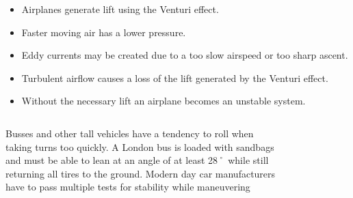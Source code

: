 \begin{frame}
	\begin{itemize}
		\item Airplanes generate lift using the Venturi effect.
		\item Faster moving air has a lower pressure.
		\item Eddy currents may be created due to a too slow airspeed or too sharp ascent.
		\item Turbulent airflow causes a loss of the lift generated by the Venturi effect.
		\item Without the necessary lift an airplane becomes an unstable system.
	\end{itemize}
\end{frame}
\begin{frame}
	\begin{columns}
		\begin{column}{0.6\textwidth}
			Busses and other tall vehicles have a tendency to roll when taking turns too quickly.
			A London bus is loaded with sandbags and must be able to lean at an angle of at least 28˚ while still returning all tires to the ground.
			Modern day car manufacturers have to pass multiple tests for stability while maneuvering
		\end{column}
		\begin{column}
			\begin{figure}
				\centering
				\includegraphics[width=0.8\linewidth]{Images/discrete_time_systems_32}
				\label{fig:discrete_time_systems_32}
			\end{figure}
		\end{column}
	\end{columns}
\end{frame}
